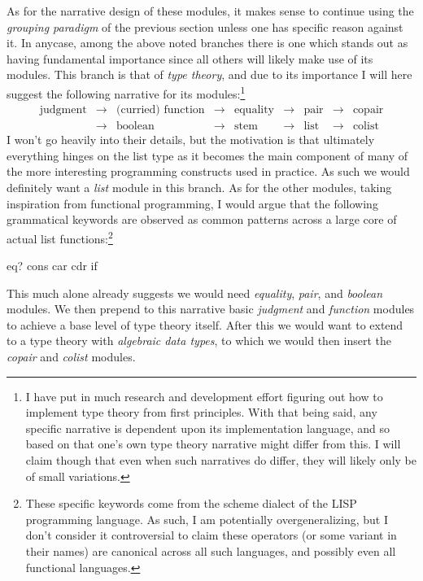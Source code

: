 \documentclass[twoside]{article}
\newcommand{\lra}{\longrightarrow}
\begin{document}
As for the narrative design of these modules, it makes sense to continue using the \emph{grouping paradigm} of the previous
section unless one has specific reason against it. In anycase, among the above noted branches there is one which stands out
as having fundamental importance since all others will likely make use of its modules. This branch is that of \emph{type theory},
and due to its importance I will here suggest the following narrative for its modules:\footnote{I have put in much research
and development effort figuring out how to implement type theory from first principles. With that being said, any specific
narrative is dependent upon its implementation language, and so based on that one's own type theory narrative might differ
from this. I will claim though that even when such narratives do differ, they will likely only be of small variations.}
$$ \begin{array}{rclclclcl}
\mbox{judgment}	& \lra & \mbox{(curried) function}	& \lra & \mbox{equality}& \lra & \mbox{pair}	& \lra & \mbox{copair} \\[1ex]
		& \lra & \mbox{boolean}			& \lra & \mbox{stem}	& \lra & \mbox{list}	& \lra & \mbox{colist}
\end{array} $$
I won't go heavily into their details, but the motivation is that ultimately everything hinges on the list type as it becomes
the main component of many of the more interesting programming constructs used in practice. As such we would definitely want
a \emph{list} module in this branch. As for the other modules, taking inspiration from functional programming, I would argue
that the following grammatical keywords are observed as common patterns across a large core of actual list
functions:\footnote{These specific keywords come from the scheme dialect of the LISP programming language. As such, I am
potentially overgeneralizing, but I don't consider it controversial to claim these operators (or some variant in their names)
are canonical across all such languages, and possibly even all functional languages.}
\begin{center}
eq? \quad cons \quad car \quad cdr \quad if
\end{center}
This much alone already suggests we would need \emph{equality}, \emph{pair}, and \emph{boolean} modules. We then prepend
to this narrative basic \emph{judgment} and \emph{function} modules to achieve a base level of type theory itself. After
this we would want to extend to a type theory with \emph{algebraic data types}, to which we would then insert the
\emph{copair} and \emph{colist} modules.
\end{document}
